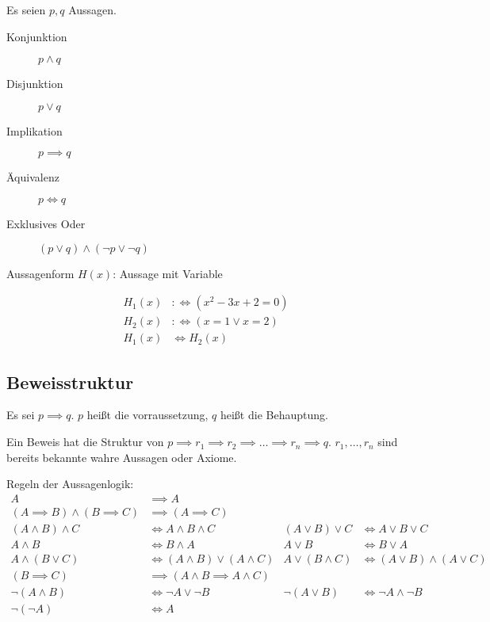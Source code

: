 \begin{definition}
  Es seien $p, q$ Aussagen.
  \begin{description}
  \item[Konjunktion] $p \wedge q$
  \item[Disjunktion] $p \vee q$
  \item[Implikation] $p \implies q$
  \item[Äquivalenz] $p \iff q$
  \item[Exklusives Oder] $(p \vee q) \wedge (\neg p \vee \neg q)$
  \end{description}
\end{definition}

\begin{definition}
  Aussagenform $H(x)$: Aussage mit Variable
\end{definition}
\begin{example}
  \begin{align*}
    H_1(x) &:\iff (x^2 - 3x + 2 = 0) \\
    H_2(x) &:\iff (x = 1 \vee x = 2) \\
    H_1(x) &\iff H_2(x)
  \end{align*}
\end{example}

\subsection{Beweisstruktur}
Es sei $p \implies q$. $p$ heißt die vorraussetzung, $q$ heißt die Behauptung.

Ein Beweis hat die Struktur von $p \implies r_1 \implies r_2 \implies \dots \implies r_n \implies q$. $r_1, \dots, r_n$ sind bereits bekannte wahre Aussagen oder Axiome.

\begin{theorem}
  Regeln der Aussagenlogik:
  \begin{align*}
    A &\implies A \\
    (A \implies B) \wedge (B \implies C) &\implies (A \implies C) \tag{Transitivität} \\
    (A \wedge B) \wedge C &\iff A \wedge B \wedge C & (A \vee B) \vee C &\iff A \vee B \vee C \tag{Assoziativität} \\
    A \wedge B &\iff B \wedge A & A \vee B &\iff B \vee A \tag{Kommutativität} \\
    A \wedge (B \vee C) &\iff (A \wedge B) \vee (A \wedge C) & A \vee (B \wedge C) &\iff (A \vee B) \wedge (A \vee C) \tag{Distributivität} \\
    (B \implies C) &\implies (A \wedge B \implies A \wedge C) \tag{Monotonie} \\
    \neg (A \wedge B) &\iff \neg A \vee \neg B & \neg (A \vee B) &\iff \neg A \wedge \neg B \tag{Morgan'sche Regeln} \\
    \neg (\neg A) &\iff A \tag{Doppelte Negation}
  \end{align*}
\end{theorem}

